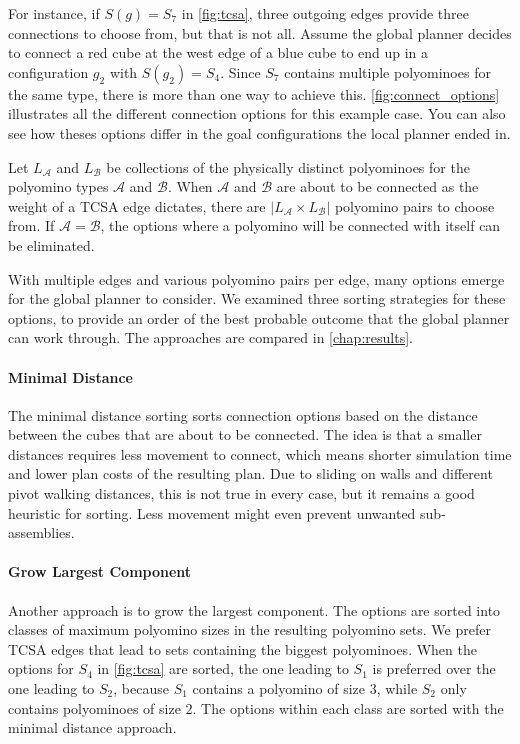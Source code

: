 For instance, if $S(g) = S_7$ in \autoref{fig:tcsa}, three outgoing edges provide three connections to choose from, but that is not all.
Assume the global planner decides to connect a red cube at the west edge of a blue cube to end up in a configuration $g_2$ with $S(g_2) = S_4$.
Since $S_7$ contains multiple polyominoes for the same type, there is more than one way to achieve this.
\autoref{fig:connect_options} illustrates all the different connection options for this example case.
You can also see how theses options differ in the goal configurations the local planner ended in.

Let $L_\mathcal{A}$ and $L_\mathcal{B}$ be collections of the physically distinct polyominoes for the polyomino types $\mathcal{A}$ and $\mathcal{B}$.
When $\mathcal{A}$ and $\mathcal{B}$ are about to be connected as the weight of a TCSA edge dictates, there are $\left| L_\mathcal{A} \times L_\mathcal{B} \right|$ polyomino pairs to choose from.
If $\mathcal{A} = \mathcal{B}$, the options where a polyomino will be connected with itself can be eliminated.

With multiple edges and various polyomino pairs per edge, many options emerge for the global planner to consider.
We examined three sorting strategies for these options, to provide an order of the best probable outcome that the global planner can work through. 
The approaches are compared in \autoref{chap:results}.

\paragraph{Minimal Distance}

The minimal distance sorting sorts connection options based on the distance between the cubes that are about to be connected.
The idea is that a smaller distances requires less movement to connect, which means shorter simulation time and lower plan costs of the resulting plan.
Due to sliding on walls and different pivot walking distances, this is not true in every case, but it remains a good heuristic for sorting.
Less movement might even prevent unwanted sub-assemblies.

\paragraph{Grow Largest Component}

Another approach is to grow the largest component.
The options are sorted into classes of maximum polyomino sizes in the resulting polyomino sets.
We prefer TCSA edges that lead to sets containing the biggest polyominoes.
When the options for $S_4$ in \autoref{fig:tcsa} are sorted, the one leading to $S_1$ is preferred over the one leading to $S_2$, because $S_1$ contains a polyomino of size $3$, while $S_2$ only contains polyominoes of size $2$. 
The options within each class are sorted with the minimal distance approach.

